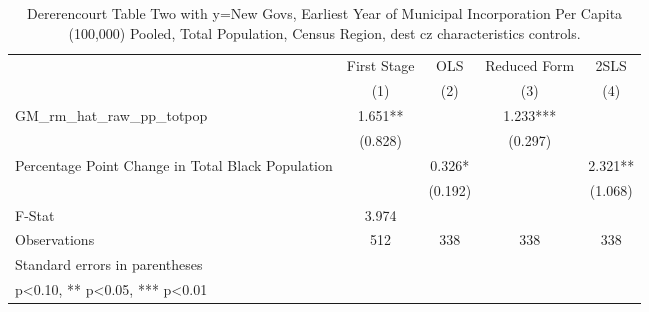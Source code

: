 \begin{table}[htbp]\centering
\def\sym#1{\ifmmode^{#1}\else\(^{#1}\)\fi}
\caption{Dererencourt Table Two with y=New Govs, Earliest Year of Municipal Incorporation Per Capita (100,000) Pooled, Total Population, Census Region, dest cz characteristics controls.}
\begin{tabular}{l*{4}{c}}
\toprule
                    & First Stage   &         OLS   &Reduced Form   &        2SLS   \\
                    &\multicolumn{1}{c}{(1)}   &\multicolumn{1}{c}{(2)}   &\multicolumn{1}{c}{(3)}   &\multicolumn{1}{c}{(4)}   \\
\midrule
GM\_rm\_hat\_raw\_pp\_totpop&       1.651** &               &       1.233***&               \\
                    &     (0.828)   &               &     (0.297)   &               \\
\addlinespace
Percentage Point Change in Total Black Population&               &       0.326*  &               &       2.321** \\
                    &               &     (0.192)   &               &     (1.068)   \\
\midrule
F-Stat              &       3.974   &               &               &               \\
Observations        &         512   &         338   &         338   &         338   \\
\bottomrule
\multicolumn{5}{l}{\footnotesize Standard errors in parentheses}\\
\multicolumn{5}{l}{\footnotesize * p<0.10, ** p<0.05, *** p<0.01}\\
\end{tabular}
\end{table}
